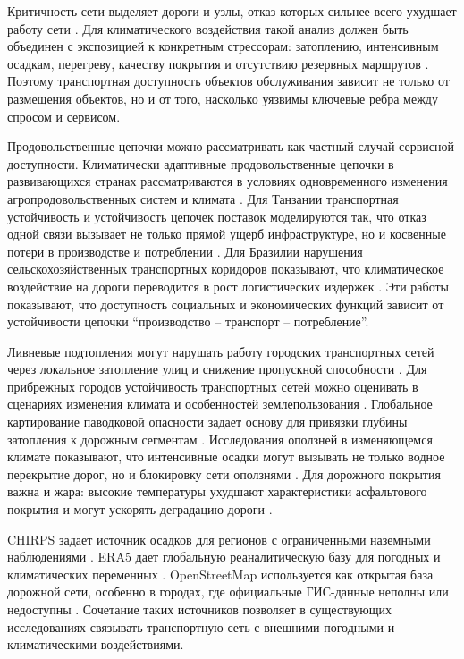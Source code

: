 Критичность сети выделяет дороги и узлы, отказ которых сильнее всего ухудшает работу сети \cite{yin2023transportResilience}. Для климатического воздействия такой анализ должен быть объединен с экспозицией к конкретным стрессорам: затоплению, интенсивным осадкам, перегреву, качеству покрытия и отсутствию резервных маршрутов \cite{rahman2025climateAwareDecision}. Поэтому транспортная доступность объектов обслуживания зависит не только от размещения объектов, но и от того, насколько уязвимы ключевые ребра между спросом и сервисом.

Продовольственные цепочки можно рассматривать как частный случай сервисной доступности. Климатически адаптивные продовольственные цепочки в развивающихся странах рассматриваются в условиях одновременного изменения агропродовольственных систем и климата \cite{reardon2018climateSmartSupply}. Для Танзании транспортная устойчивость и устойчивость цепочек поставок моделируются так, что отказ одной связи вызывает не только прямой ущерб инфраструктуре, но и косвенные потери в производстве и потреблении \cite{colon2019tanzaniaSupplyChain}. Для Бразилии нарушения сельскохозяйственных транспортных коридоров показывают, что климатическое воздействие на дороги переводится в рост логистических издержек \cite{lher2023brazilAgriculturalTransport}. Эти работы показывают, что доступность социальных и экономических функций зависит от устойчивости цепочки ``производство -- транспорт -- потребление''.

Ливневые подтопления могут нарушать работу городских транспортных сетей через локальное затопление улиц и снижение пропускной способности \cite{pregnolato2017pluvialFlooding}. Для прибрежных городов устойчивость транспортных сетей можно оценивать в сценариях изменения климата и особенностей землепользования \cite{wei2022coastalTrafficResilience}. Глобальное картирование паводковой опасности задает основу для привязки глубины затопления к дорожным сегментам \cite{dottori2016floodHazard}. Исследования оползней в изменяющемся климате показывают, что интенсивные осадки могут вызывать не только водное перекрытие дорог, но и блокировку сети оползнями \cite{gariano2016landslides}. Для дорожного покрытия важна и жара: высокие температуры ухудшают характеристики асфальтового покрытия и могут ускорять деградацию дороги \cite{khan2018asphaltTemperature}.

CHIRPS задает источник осадков для регионов с ограниченными наземными наблюдениями \cite{funk2015chirps}. ERA5 дает глобальную реаналитическую базу для погодных и климатических переменных \cite{hersbach2020era5}. OpenStreetMap используется как открытая база дорожной сети, особенно в городах, где официальные ГИС-данные неполны или недоступны \cite{osmContributors}. Сочетание таких источников позволяет в существующих исследованиях связывать транспортную сеть с внешними погодными и климатическими воздействиями.

